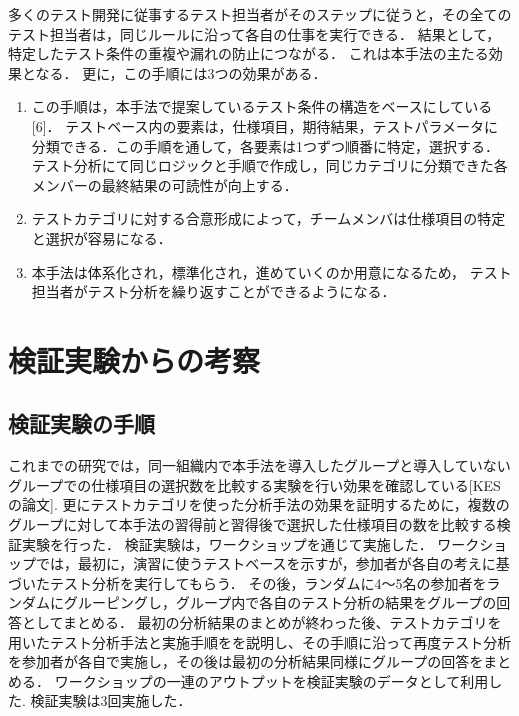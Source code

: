 \documentclass[a4paper,12pt]{jreport}
\begin{document}
多くのテスト開発に従事するテスト担当者がそのステップに従うと，その全てのテスト担当者は，同じルールに沿って各自の仕事を実行できる． 
結果として，特定したテスト条件の重複や漏れの防止につながる．
これは本手法の主たる効果となる．
更に，この手順には3つの効果がある．
\begin{enumerate}
\item この手順は，本手法で提案しているテスト条件の構造をベースにしている [6]． テストベース内の要素は，仕様項目，期待結果，テストパラメータに分類できる．この手順を通して，各要素は1つずつ順番に特定，選択する． テスト分析にて同じロジックと手順で作成し，同じカテゴリに分類できた各メンバーの最終結果の可読性が向上する．
\item テストカテゴリに対する合意形成によって，チームメンバは仕様項目の特定と選択が容易になる．
\item 本手法は体系化され，標準化され，進めていくのか用意になるため， テスト担当者がテスト分析を繰り返すことができるようになる．
\end{enumerate}

\section{検証実験からの考察}
\subsection{検証実験の手順}
これまでの研究では，同一組織内で本手法を導入したグループと導入していないグループでの仕様項目の選択数を比較する実験を行い効果を確認している[KESの論文].
更にテストカテゴリを使った分析手法の効果を証明するために，複数のグループに対して本手法の習得前と習得後で選択した仕様項目の数を比較する検証実験を行った．
検証実験は，ワークショップを通じて実施した．
ワークショップでは，最初に，演習に使うテストベースを示すが，参加者が各自の考えに基づいたテスト分析を実行してもらう．
その後，ランダムに4〜5名の参加者をランダムにグルーピングし，グループ内で各自のテスト分析の結果をグループの回答としてまとめる．
最初の分析結果のまとめが終わった後、テストカテゴリを用いたテスト分析手法と実施手順をを説明し、その手順に沿って再度テスト分析を参加者が各自で実施し，その後は最初の分析結果同様にグループの回答をまとめる．
ワークショップの一連のアウトプットを検証実験のデータとして利用した.
検証実験は3回実施した．
\end{document}
